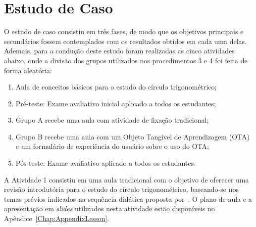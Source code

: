

\section{Estudo de Caso}\label{sec:estudo_caso1}

O estudo de caso consistiu em três fases, de modo que os objetivos principais e secundários fossem contemplados com os resultados obtidos em cada uma delas. Ademais, %
para a condução deste estudo foram realizadas as cinco atividades abaixo, onde a divisão dos grupos utilizados nos procedimentos 3 e 4 foi feita de forma aleatória:

\begin{enumerate}
	\item Aula de conceitos básicos para o estudo do círculo trigonométrico;
	\item Pré-teste: Exame avaliativo inicial aplicado a todos os estudantes;
	\item Grupo A recebe uma aula com atividade de fixação tradicional;
	\item Grupo B recebe uma aula com um Objeto Tangível de Aprendizagem (OTA) e um formulário de experiência do usuário sobre o uso do OTA;
	\item Pós-teste: Exame avaliativo aplicado a todos os estudantes.
\end{enumerate}

A Atividade 1 consistiu em uma aula tradicional com o objetivo de oferecer uma revisão introdutória para o estudo do círculo trigonométrico, baseando-se nos temas prévios indicados na sequência didática proposta por~\cite{silva:2011}. O plano de aula e a apresentação em \textit{slides} utilizados nesta atividade estão disponíveis no Apêndice~\ref{Chap:AppendixLesson}.

